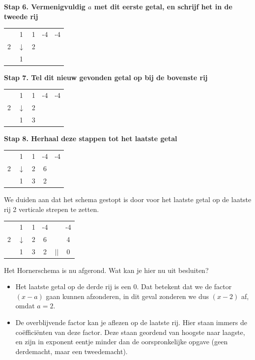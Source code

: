 \begin{voorbeeld}
\textbf{Stap 6. Vermenigvuldig $a$ met dit eerste getal, en schrijf het in de tweede rij}

\begin{center}
	\begin{tabular}{c|cccc}
		& 1 & 1 & -4 & -4 \\
		2 & $\downarrow$ & 2 & & \\
		\hline 
		& 1 & & & 
	\end{tabular}
\end{center}

\textbf{Stap 7. Tel dit nieuw gevonden getal op bij de bovenste rij}

\begin{center}
	\begin{tabular}{c|cccc}
		& 1 & 1 & -4 & -4 \\
		2 & $\downarrow$ & 2 & & \\
		\hline 
		& 1 & 3 & & 
	\end{tabular}
\end{center}

\textbf{Stap 8. Herhaal deze stappen tot het laatste getal}

\begin{center}
	\begin{tabular}{c|cccc}
		& 1 & 1 & -4 & -4 \\
		2 & $\downarrow$ & 2 & 6 & \\
		\hline 
		& 1 & 3 & 2 & 
	\end{tabular}
\end{center}

We duiden aan dat het schema gestopt is door voor het laatste getal op de laatste rij 2 verticale strepen te zetten.

\begin{center}
	\begin{tabular}{c|ccccc}
		& 1 & 1 & -4 & & -4 \\
		2 & $\downarrow$ & 2 & 6 & & 4\\
		\hline 
		& 1 & 3 & 2 & $||$ & 0 
	\end{tabular}
\end{center}

Het Hornerschema is nu afgerond. Wat kan je hier nu uit besluiten?
\begin{itemize}
	\item Het laatste getal op de derde rij is een $0$. Dat betekent dat we de factor $(x-a)$ gaan kunnen afzonderen, in dit geval zonderen we dus $(x-2)$ af, omdat $a=2$.
	\item De overblijvende factor kan je aflezen op de laatste rij. Hier staan immers de co\"effici\"enten van deze factor. Deze staan geordend van hoogste naar laagste, en zijn in exponent eentje minder dan de oorspronkelijke opgave (geen derdemacht, maar een tweedemacht).
\end{itemize}


\end{voorbeeld}
